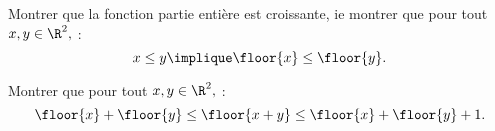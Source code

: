 
\begin{exercice}%
Montrer que la fonction partie entière est croissante, ie montrer que pour tout $x, y\in \R^2,$ : 
$$x\leq y \implique \floor{x} \leq \floor{y}.$$

Montrer que pour tout $x, y\in \R^2,$ : 
$$\floor{x}+\floor{y} \leq \floor{x+y} \leq \floor{x} +\floor{y}+1.$$
\end{exercice}